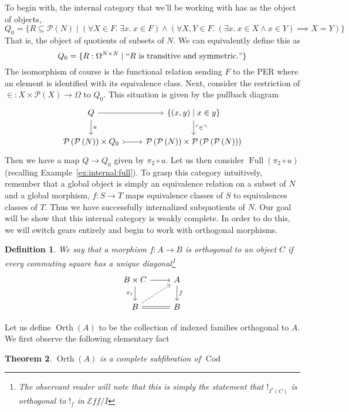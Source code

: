 \documentclass[12pt]{amsart}
\newcommand{\eff}{\mathcal{E}\!f\!f}
\newcommand{\pow}[1]{\ensuremath{\mathcal{P}\left(#1\right)}}
\newcommand{\unchar}[1]{\ensuremath{\ulcorner #1 \urcorner}}
\DeclareMathOperator{\cod}{Cod}
\DeclareMathOperator{\full}{Full}
\DeclareMathOperator{\orth}{Orth}
\newtheorem{thm}{Theorem}[section]
\newtheorem{defn}[thm]{Definition}
\begin{document}
To begin with, the internal category that we'll be working with has as
the object of objects,
\[
  Q_0 = \{R \subseteq \pow{N} \mid (\forall X \in F.\ \exists x.\ x \in F)
  \mathrel{\wedge}
  (\forall X, Y \in F.\ (\exists x.\ x \in X \mathrel{\wedge} x \in Y) \implies X = Y)\}
\]
That is, the object of quotients of subsets of $N$. We can
equivalently define this as
\[
  Q_0 = \{R : \Omega^{N \times N} \mid ``R \text{ is transitive and symmetric.}"\}
\]
The isomorphism of course is the functional relation sending $F$ to
the PER where an element is identified with its equivalence
class. Next, consider the restriction of
$\in : X \times \pow{X} \to \Omega$ to $Q_0$. This situation is given
by the pullback diagram
\[
  \begin{tikzcd}
    Q \ar[d, "u"] \ar[r] & {\{(x, y) \mid x \in y\}} \ar[d, "\unchar{\in}"]\\
     \pow{\pow{N}} \times Q_0 \ar[r, rightarrowtail] & \pow{\pow{N}} \times \pow{\pow{\pow{N}}}
  \end{tikzcd}
\]
Then we have a map $Q \to Q_0$ given by $\pi_2 \circ u$. Let us then
consider $\full(\pi_2 \circ u)$ (recalling
Example~\ref{ex:internal:full}). To grasp this category intuitively,
remember that a global object is simply an equivalence relation on a
subset of $N$ and a global morphism, $f : S \to T$ maps equivalence
classes of $S$ to equivalences classes of $T$. Thus we have
successfully internalized subquotients of $N$. Our goal will be show
that this internal category is weakly complete. In order to do this,
we will switch gears entirely and begin to work with orthogonal
morphisms.
\begin{defn}\label{defn:orth:orth}
  We say that a morphism $f : A \to B$ is orthogonal to an object $C$
  if every commuting square has a unique diagonal\footnote{The
    observant reader will note that this is simply the statement that
    $!_{I^*(C)}$ is orthogonal to $!_{f}$ in $\eff/I$}
  \[
    \begin{tikzcd}
      B \times C \ar[d, swap, "\pi_1"] \ar[r] & A \ar[d, "f"]\\
      B \ar[r, equals] \ar[ur, dashed] & B
    \end{tikzcd}
  \]
\end{defn}
Let us define $\orth(A)$ to be the collection of indexed families
orthogonal to $A$. We first observe the following elementary fact
\begin{thm}\label{thm:orth:orthfibration}
  $\orth(A)$ is a complete subfibration of $\cod$
\end{thm}
\end{document}
